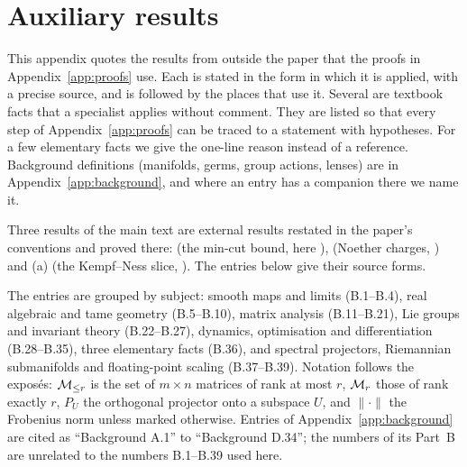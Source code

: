 \providecommand{\fbBusedin}[1]{\par\smallskip\noindent{\small\color{inkgray}{\sffamily\bfseries\color{tide}Used in.}\enspace #1\par}\medskip}

\section{Auxiliary results}\label{app:auxiliary}

This appendix quotes the results from outside the paper that the proofs in Appendix~\ref{app:proofs} use. Each is
stated in the form in which it is applied, with a precise source, and is followed by the places that use it. Several are
textbook facts that a specialist applies without comment. They are listed so that every step of Appendix~\ref{app:proofs}
can be traced to a statement with hypotheses. For a few elementary facts we give the one-line reason instead of a
reference. Background definitions (manifolds, germs, group actions, lenses) are in Appendix~\ref{app:background}, and
where an entry has a companion there we name it.

Three results of the main text are external results restated in the paper's conventions and proved there:
 (the min-cut bound, here ),  (Noether charges,
) and (a) (the Kempf--Ness slice, ). The entries below give their
source forms.

The entries are grouped by subject: smooth maps and limits (B.1--B.4), real algebraic and tame geometry (B.5--B.10),
matrix analysis (B.11--B.21), Lie groups and invariant theory (B.22--B.27), dynamics, optimisation and differentiation
(B.28--B.35), three elementary facts (B.36), and spectral projectors, Riemannian submanifolds and floating-point
scaling (B.37--B.39). Notation follows the exposés: $\mathcal{M}_{\le r}$ is the set of $m\times n$ matrices of
rank at most $r$, $\mathcal{M}_r$ those of rank exactly $r$, $P_U$ the orthogonal projector onto a subspace $U$, and
$\lVert\cdot\rVert$ the Frobenius norm unless marked otherwise. Entries of Appendix~\ref{app:background} are cited as
``Background A.1'' to ``Background D.34''; the numbers of its Part~B are unrelated to the numbers B.1--B.39 used here.

